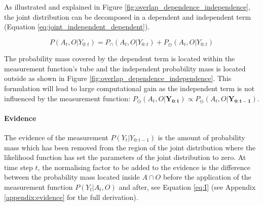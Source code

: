 As illustrated and explained in Figure \ref{fig:overlap_dependence_independence}, the joint distribution can be decomposed in a 
dependent and independent term (Equation \ref{eq:joint_independent_dependent}). 

\begin{equation}\label{eq:joint_independent_dependent}
 P(A_t,O|Y_{0:t}) = P_{\cap}(A_t,O|Y_{0:t}) + P_{\ominus}(A_t,O|Y_{0:t})
\end{equation}

The probability mass covered by the dependent term is located within the measurement function's tube and the independent probability mass 
is located outside as shown in Figure \ref{fig:overlap_dependence_independence}. This formulation will lead to large computational gain 
as the independent term is not influenced by the measurement function: 
$P_{\ominus}(A_t,O|\mathbf{Y_{0:t}}) \propto P_{\ominus}(A_t,O|\mathbf{Y_{0:t-1}})$.

\paragraph{Evidence}
The evidence of the measurement $P(Y_t|Y_{0:t-1})$ is the amount of probability mass which has been removed from the region of the joint 
distribution where the likelihood function has set the parameters of the joint distribution to zero. At time step $t$, the normalising factor to be added to 
the evidence is the difference between the probability mass located inside $A\cap O$ before the application of the measurement 
function $P(Y_t|A_t,O)$ and after, see Equation \ref{eq:I} (see Appendix \ref{appendix:evidence} for the full derivation).

